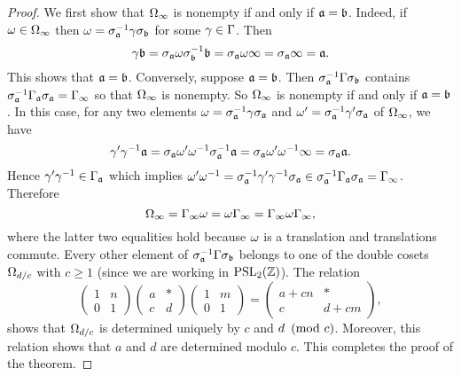     \begin{proof}
      We first show that $\Omega_{\infty}$ is nonempty if and only if $\mathfrak{a} = \mathfrak{b}$. Indeed, if $\omega \in \Omega_{\infty}$ then $\omega = \sigma_{\mathfrak{a}}^{-1}\gamma\sigma_{\mathfrak{b}}$ for some $\gamma \in \Gamma$. Then
      \[
        \gamma\mathfrak{b} = \sigma_{\mathfrak{a}}\omega\sigma_{\mathfrak{b}}^{-1}\mathfrak{b} = \sigma_{\mathfrak{a}}\omega\infty = \sigma_{\mathfrak{a}}\infty = \mathfrak{a}.
      \]
      This shows that $\mathfrak{a} = \mathfrak{b}$. Conversely, suppose $\mathfrak{a} = \mathfrak{b}$. Then $\sigma_{\mathfrak{a}}^{-1}\Gamma\sigma_{\mathfrak{b}}$ contains $\sigma_{\mathfrak{a}}^{-1}\Gamma_{\mathfrak{a}}\sigma_{\mathfrak{a}} = \Gamma_{\infty}$ so that $\Omega_{\infty}$ is nonempty. So $\Omega_{\infty}$ is nonempty if and only if $\mathfrak{a} = \mathfrak{b}$. In this case, for any two elements $\omega = \sigma_{\mathfrak{a}}^{-1}\gamma\sigma_{\mathfrak{a}}$ and $\omega' = \sigma_{\mathfrak{a}}^{-1}\gamma'\sigma_{\mathfrak{a}}$ of $\Omega_{\infty}$, we have
      \[
        \gamma'\gamma^{-1}\mathfrak{a} = \sigma_{\mathfrak{a}}\omega'\omega^{-1}\sigma_{\mathfrak{a}}^{-1}\mathfrak{a} = \sigma_{\mathfrak{a}}\omega'\omega^{-1}\infty = \sigma_{\mathfrak{a}}\mathfrak{a}.
      \]
      Hence $\gamma'\gamma^{-1} \in \Gamma_{\mathfrak{a}}$ which implies $\omega'\omega^{-1} = \sigma_{\mathfrak{a}}^{-1}\gamma'\gamma^{-1}\sigma_{\mathfrak{a}} \in \sigma_{\mathfrak{a}}^{-1}\Gamma_{\mathfrak{a}}\sigma_{\mathfrak{a}} = \Gamma_{\infty}$. Therefore
      \[
        \Omega_{\infty} = \Gamma_{\infty}\omega = \omega\Gamma_{\infty} = \Gamma_{\infty}\omega\Gamma_{\infty},
      \]
      where the latter two equalities hold because $\omega$ is a translation and translations commute. Every other element of $\sigma_{\mathfrak{a}}^{-1}\Gamma\sigma_{\mathfrak{b}}$ belongs to one of the double cosets $\Omega_{d/c}$ with $c \ge 1$ (since we are working in $\mathrm{PSL}_{2}(\mathbb{Z})$). The relation
      \[
        \begin{pmatrix} 1 & n \\ 0 & 1 \end{pmatrix}\begin{pmatrix} a & \ast \\ c & d \end{pmatrix}\begin{pmatrix} 1 & m \\ 0 & 1 \end{pmatrix} = \begin{pmatrix} a+cn & \ast \\ c & d+cm \end{pmatrix},
      \]
      shows that $\Omega_{d/c}$ is determined uniquely by $c$ and $d \ \left(\text{mod }c\right)$. Moreover, this relation shows that $a$ and $d$ are determined modulo $c$. This completes the proof of the theorem.
    \end{proof}

